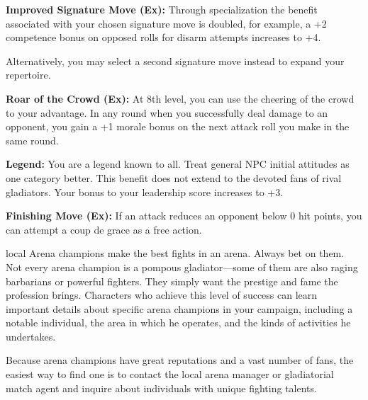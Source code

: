 {\textbf{Improved Signature Move (Ex):} Through specialization the benefit associated with your chosen signature move is doubled, for example, a +2 competence bonus on opposed rolls for disarm attempts increases to +4.

Alternatively, you may select a second signature move instead to expand your repertoire.

\textbf{Roar of the Crowd (Ex):} At 8th level, you can use the cheering of the crowd to your advantage. In any round when you successfully deal damage to an opponent, you gain a +1 morale bonus on the next attack roll you make in the same round.

\textbf{Legend:} You are a legend known to all. Treat general NPC initial attitudes as one category better. This benefit does not extend to the devoted fans of rival gladiators. Your bonus to your leadership score increases to +3.

\textbf{Finishing Move (Ex):} If an attack reduces an opponent below 0 hit points, you can attempt a coup de grace as a free action.
}
{}
{local}
{Arena champions make the best fights in an arena. Always bet on them.}
{Not every arena champion is a pompous gladiator---some of them are also raging barbarians or powerful fighters. They simply want the prestige and fame the profession brings.}
{Characters who achieve this level of success can learn important details about specific arena champions in your campaign, including a notable individual, the area in which he operates, and the kinds of activities he undertakes.}

Because arena champions have great reputations and a vast number of fans, the easiest way to find one is to contact the local arena manager or gladiatorial match agent and inquire about individuals with unique fighting talents.